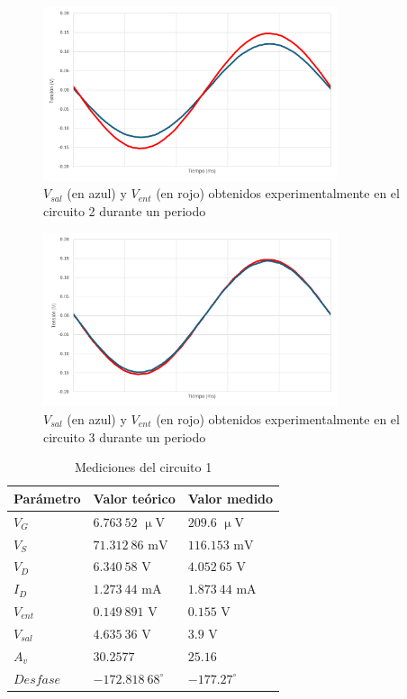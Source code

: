 \documentclass[journal]{IEEEtran}
\begin{document}
\begin{figure}[H]
        \centering
        \includegraphics[width=3.4in]{C2222.png}
        \caption{$V_{sal}$ (en azul) y $V_{ent}$ (en rojo) obtenidos experimentalmente en el circuito 2 durante un periodo}
        \label{fig:SignalExperimental_03}
\end{figure}

\begin{figure}[H]
        \centering
        \includegraphics[width=3.4in]{2C2222.png}
        \caption{$V_{sal}$ (en azul) y $V_{ent}$ (en rojo) obtenidos experimentalmente en el circuito 3 durante un periodo}
        \label{fig:SignalExperimental_04}
\end{figure}

\begin{table}[H]
        \renewcommand{\arraystretch}{1.5}
        \caption{Mediciones del circuito 1}
        \centering
        \begin{tabular}{ >{\centering\arraybackslash}m{2.5cm} >{\centering\arraybackslash}m{2.5cm} >{\centering\arraybackslash}m{2.5cm} }
                \hline
            Parámetro & Valor teórico & Valor medido\\ 
            \hline
            $V_G$ & $6.763~52$ $\upmu\mathrm{V}$ & $209.6$ $\upmu\mathrm{V}$ \\ 
            $V_S$ & $71.312~86$ $\mathrm{mV}$ & $116.153$ $\mathrm{mV}$ \\
            $V_D$ & $6.340~58$ $\mathrm{V}$ & $4.052~65$ $\mathrm{V}$ \\
            $I_D$ & $1.273~44$ $\mathrm{mA}$ & $1.873~44$ $\mathrm{mA}$ \\
            $V_{ent}$ & $0.149~891$ $\mathrm{V}$ & $0.155$ $\mathrm{V}$ \\ 
            $V_{sal}$ & $4.635~36$ $\mathrm{V}$ & $3.9$ $\mathrm{V}$ \\
            $A_v$ & $30.2577$ & $25.16$ \\
            $Desfase$ & $-172.818~68^{\circ}$  & $-177.27^{\circ}$ \\
            \hline
        \end{tabular}
        \label{tabla6}
    \end{table}
\end{document}
